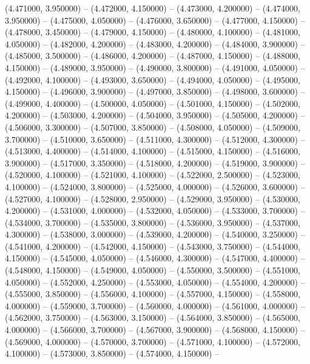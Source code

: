 (4.471000, 3.950000) -- 
(4.472000, 4.150000) -- 
(4.473000, 4.200000) -- 
(4.474000, 3.950000) -- 
(4.475000, 4.050000) -- 
(4.476000, 3.650000) -- 
(4.477000, 4.150000) -- 
(4.478000, 3.450000) -- 
(4.479000, 4.150000) -- 
(4.480000, 4.100000) -- 
(4.481000, 4.050000) -- 
(4.482000, 4.200000) -- 
(4.483000, 4.200000) -- 
(4.484000, 3.900000) -- 
(4.485000, 3.500000) -- 
(4.486000, 4.200000) -- 
(4.487000, 4.150000) -- 
(4.488000, 4.150000) -- 
(4.489000, 3.950000) -- 
(4.490000, 3.800000) -- 
(4.491000, 4.050000) -- 
(4.492000, 4.100000) -- 
(4.493000, 3.650000) -- 
(4.494000, 4.050000) -- 
(4.495000, 4.150000) -- 
(4.496000, 3.900000) -- 
(4.497000, 3.850000) -- 
(4.498000, 3.600000) -- 
(4.499000, 4.400000) -- 
(4.500000, 4.050000) -- 
(4.501000, 4.150000) -- 
(4.502000, 4.200000) -- 
(4.503000, 4.200000) -- 
(4.504000, 3.950000) -- 
(4.505000, 4.200000) -- 
(4.506000, 3.300000) -- 
(4.507000, 3.850000) -- 
(4.508000, 4.050000) -- 
(4.509000, 3.700000) -- 
(4.510000, 3.650000) -- 
(4.511000, 4.300000) -- 
(4.512000, 4.300000) -- 
(4.513000, 4.400000) -- 
(4.514000, 4.100000) -- 
(4.515000, 4.150000) -- 
(4.516000, 3.900000) -- 
(4.517000, 3.350000) -- 
(4.518000, 4.200000) -- 
(4.519000, 3.900000) -- 
(4.520000, 4.100000) -- 
(4.521000, 4.100000) -- 
(4.522000, 2.500000) -- 
(4.523000, 4.100000) -- 
(4.524000, 3.800000) -- 
(4.525000, 4.000000) -- 
(4.526000, 3.600000) -- 
(4.527000, 4.100000) -- 
(4.528000, 2.950000) -- 
(4.529000, 3.950000) -- 
(4.530000, 4.200000) -- 
(4.531000, 4.000000) -- 
(4.532000, 4.050000) -- 
(4.533000, 3.700000) -- 
(4.534000, 3.700000) -- 
(4.535000, 3.800000) -- 
(4.536000, 3.950000) -- 
(4.537000, 4.300000) -- 
(4.538000, 3.000000) -- 
(4.539000, 4.200000) -- 
(4.540000, 3.250000) -- 
(4.541000, 4.200000) -- 
(4.542000, 4.150000) -- 
(4.543000, 3.750000) -- 
(4.544000, 4.150000) -- 
(4.545000, 4.050000) -- 
(4.546000, 4.300000) -- 
(4.547000, 4.400000) -- 
(4.548000, 4.150000) -- 
(4.549000, 4.050000) -- 
(4.550000, 3.500000) -- 
(4.551000, 4.050000) -- 
(4.552000, 4.250000) -- 
(4.553000, 4.050000) -- 
(4.554000, 4.200000) -- 
(4.555000, 3.850000) -- 
(4.556000, 4.100000) -- 
(4.557000, 4.150000) -- 
(4.558000, 4.000000) -- 
(4.559000, 3.700000) -- 
(4.560000, 4.000000) -- 
(4.561000, 4.000000) -- 
(4.562000, 3.750000) -- 
(4.563000, 3.150000) -- 
(4.564000, 3.850000) -- 
(4.565000, 4.000000) -- 
(4.566000, 3.700000) -- 
(4.567000, 3.900000) -- 
(4.568000, 4.150000) -- 
(4.569000, 4.000000) -- 
(4.570000, 3.700000) -- 
(4.571000, 4.100000) -- 
(4.572000, 4.100000) -- 
(4.573000, 3.850000) -- 
(4.574000, 4.150000) -- 
